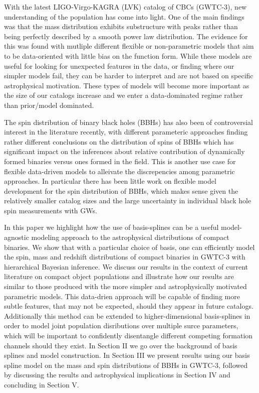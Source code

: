 \documentclass[twocolumn, linenumber]{aastex63}
\begin{document}
With the latest LIGO-Virgo-KAGRA (LVK) catalog of CBCs (GWTC-3), new understanding of the population has come into light. One of the main findings was that 
the mass distribution exhibits substructure with peaks rather than being perfectly described by a smooth power law distribution. The evidence for this was 
found with mutliple different flexible or non-parametric models that aim to be data-oriented with little bias on the function form. While these models are 
useful for looking for unexpected features in the data, or finding where our simpler models fail, they can be harder to interpret and are not based on specific
astrophysical motivation. These types of models will become more important as the size of our catalogs increase and we enter a data-dominated regime rather than
prior/model dominated. 

The spin distribution of binary black holes (BBHs) has also been of controversial interest in the literature recently, with different parameteric approaches finding 
rather different conclusions on the distribution of spins of BBHs which has significant impact on the inferences about relative contribution of dynamically formed
binaries versus ones formed in the field. This is another use case for flexible data-driven models to alleivate the discrepencies among parametric approaches. 
In particular there has been little work on flexible model development for the spin distribution of BBHs, which makes sense given the relatively smaller catalog 
sizes and the large uncertainty in individual black hole spin measurements with GWs.

In this paper we highlight how the use of basis-splines can be a useful model-agnostic modeling approach to the astrophysical distributions of compact 
binaries. We show that with a particular choice of basis, one can efficiently model the spin, mass and redshift distributions of compact binaries in GWTC-3 with
hierarchical Bayesian inference. We discuss our results in the context of current literature on compact object populations and illustrate how our results are similar
to those produced with the more simpler and astrophysically motivated parametric models. This data-drien approach will be capable of finding more subtle features, that 
may not be expected, should they appear in future catalogs. Additionally this method can be extended to higher-dimensional basis-splines in order to model 
joint population disributions over multiple surce parameters, which will be important to confidently disentangle different competing formation channels 
should they exist. In Section II we go over the background of basis splines and model construction. In Section III we present results using our basis spline model 
on the mass and spin distributions of BBHs in GWTC-3, followed by discussing the results and astrophysical implications in Section IV and concluding in Section V.
\end{document}
